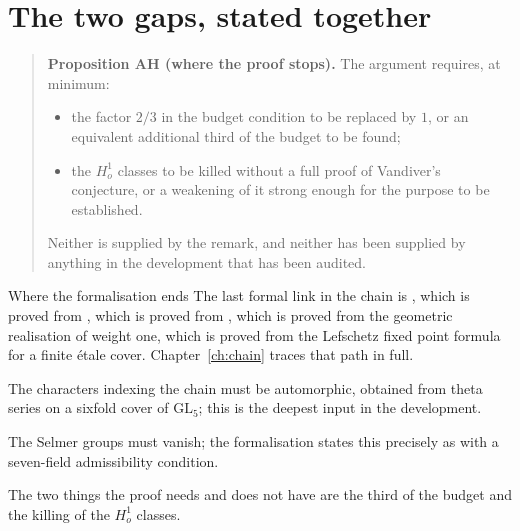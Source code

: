 \section{The two gaps, stated together}\begin{quote}
\textbf{Proposition AH (where the proof stops).} The argument requires, at
minimum:
\begin{itemize}
\item the factor $2/3$ in the budget condition to be replaced by $1$, or an
equivalent additional third of the budget to be found;
\item the $H^1_o$ classes to be killed without a full proof of Vandiver's
conjecture, or a weakening of it strong enough for the purpose to be
established.
\end{itemize}
Neither is supplied by the remark, and neither has been supplied by anything in
the development that has been audited.
\end{quote}

\begin{seamnote}{Where the formalisation ends}
The last formal link in the chain is , which is proved from
, which is proved from
, which is proved from the
geometric realisation of weight one, which is proved from the Lefschetz fixed
point formula for a finite étale cover. Chapter~\ref{ch:chain} traces that
path in full.
\end{seamnote}

\begin{keytakeaways}
\item The characters indexing the chain must be automorphic, obtained from
theta series on a sixfold cover of $\mathrm{GL}_5$; this is the deepest
input in the development.
\item The Selmer groups must vanish; the formalisation states this precisely
as  with a seven-field admissibility condition.
\item The two things the proof needs and does not have are the third of the
budget and the killing of the $H^1_o$ classes.
\end{keytakeaways}
